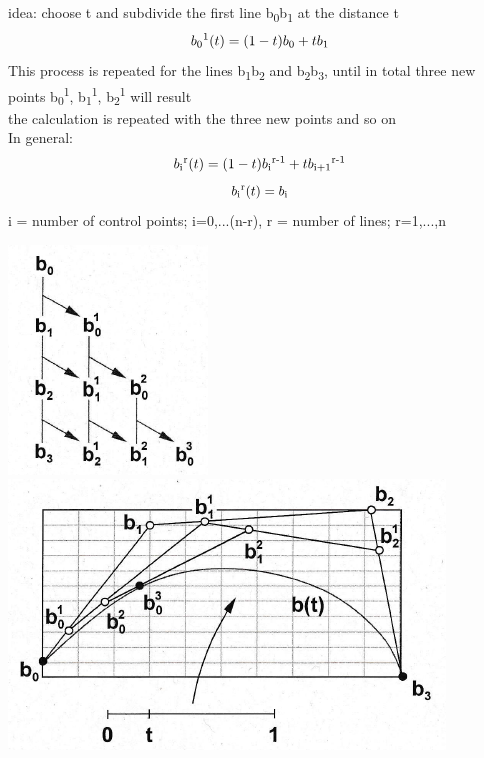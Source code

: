 \documentclass[12pt]{article}
\begin{document}
\begin{itemize}
\begin{itemize}
		idea: choose t and subdivide the first line b\textsubscript{0}b\textsubscript{1} at the distance t
		\begin{equation}
			b\textsubscript{0}\textsuperscript{1}(t) = (1-t)b\textsubscript{0}+t b\textsubscript{1}
		\end{equation}
		This process is repeated for the lines b\textsubscript{1}b\textsubscript{2} and b\textsubscript{2}b\textsubscript{3}, until in total three new points b\textsubscript{0}\textsuperscript{1}, b\textsubscript{1}\textsuperscript{1}, b\textsubscript{2}\textsuperscript{1} will result \\
		the calculation is repeated with the three new points and so on \\
		In general:
		\begin{equation}
			b\textsubscript{i}\textsuperscript{r}(t) = (1-t)b\textsubscript{i}\textsuperscript{r-1}+t b\textsubscript{i+1}\textsuperscript{r-1}
		\end{equation}
		\begin{equation}
			b\textsubscript{i}\textsuperscript{r}(t) = b\textsubscript{i}
		\end{equation}
		i = number of control points; i=0,...(n-r), r = number of lines; r=1,...,n
	\end{itemize}
	\includegraphics[scale=0.75]{3_29} \includegraphics[scale=0.75]{3_30}

\end{itemize}
\end{document}

